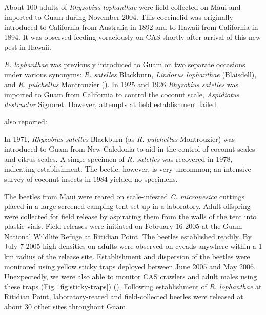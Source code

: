 \documentclass[12pt,letterpaper,english,bibliography=totocnumbered, abstract=on]{scrartcl}
\begin{document}
About 100 adults of \textit{Rhyzobius lophanthae} were field collected on Maui and imported to Guam during November 2004. This coccinelid was originally 
introduced to California from Australia in 1892 and to Hawaii from California in 1894. It was observed feeding voraciously on CAS shortly after arrival of this new pest in Hawaii. 

\textit{R. lophanthae} was previously introduced to Guam on two separate occasions under various synonyms: \textit{R. satelles} Blackburn, \textit{Lindorus lophanthae} (Blaisdell), and \textit{R. pulchellus} Montrouzier (\cite{nafus_biological_1989}).
In 1925 and 1926 \textit{Rhyzobius satelles} was imported to Guam from California to control the coconut scale, \textit{Aspidiotus destructor} Signoret. However, attempts at field establishment failed.  

\cite{nafus_biological_1989} also reported:
\begin{displayquote}
 In 1971, \textit{Rhyzobius satelles} Blackburn (as \textit{R. pulchellus} Montrouzier) was introduced to Guam from New Caledonia to aid in the control of coconut scales and citrus scales. A single specimen of \textit{R. satelles} was recovered in 1978, indicating establishment. The beetle, however, is very uncommon; an intensive survey of coconut insects in 1984 yielded no specimens.
\end{displayquote}

The beetles from Maui were reared on scale-infested \textit{C. micronesica} cuttings placed in a large screened camping tent set up in a laboratory. Adult offspring were collected for field release by aspirating them from the walls of the tent into plastic vials. Field releases were initiated on February 16 2005 at the Guam National Wildlife Refuge at Ritidian Point. The beetles established readily. By July 7 2005 high densities on adults were observed on cycads anywhere within a 1 km radius of the release site.  Establishment and dispersion of the beetles were monitored using yellow sticky traps deployed between June 2005 and May 2006. Unexpectedly, we were also able to monitor CAS crawlers and adult males using these traps (Fig. \ref{fig:sticky-traps})  (\cite{moore_biological_2017-2}). Following establishment of \textit{R. lophanthae} at Ritidian Point, laboratory-reared and field-collected beetles were released at about 30 other sites throughout Guam. 
\end{document}
